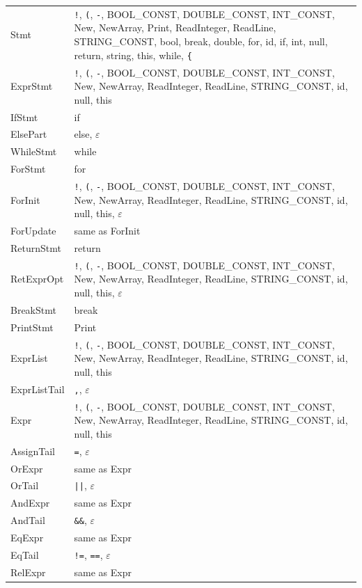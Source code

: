 \documentclass[12pt,a4paper]{article}
\begin{document}
\begin{longtable}{lp{10cm}}
Stmt           & \texttt{!}, \texttt{(}, \texttt{-}, BOOL\_CONST, DOUBLE\_CONST, INT\_CONST, New, NewArray, Print, ReadInteger, ReadLine, STRING\_CONST, bool, break, double, for, id, if, int, null, return, string, this, while, \texttt{\{} \\
ExprStmt       & \texttt{!}, \texttt{(}, \texttt{-}, BOOL\_CONST, DOUBLE\_CONST, INT\_CONST, New, NewArray, ReadInteger, ReadLine, STRING\_CONST, id, null, this \\
IfStmt         & if \\
ElsePart       & else, $\varepsilon$ \\
WhileStmt      & while \\
ForStmt        & for \\
ForInit        & \texttt{!}, \texttt{(}, \texttt{-}, BOOL\_CONST, DOUBLE\_CONST, INT\_CONST, New, NewArray, ReadInteger, ReadLine, STRING\_CONST, id, null, this, $\varepsilon$ \\
ForUpdate      & same as ForInit \\
ReturnStmt     & return \\
RetExprOpt     & \texttt{!}, \texttt{(}, \texttt{-}, BOOL\_CONST, DOUBLE\_CONST, INT\_CONST, New, NewArray, ReadInteger, ReadLine, STRING\_CONST, id, null, this, $\varepsilon$ \\
BreakStmt      & break \\
PrintStmt      & Print \\
ExprList       & \texttt{!}, \texttt{(}, \texttt{-}, BOOL\_CONST, DOUBLE\_CONST, INT\_CONST, New, NewArray, ReadInteger, ReadLine, STRING\_CONST, id, null, this \\
ExprListTail   & \texttt{,}, $\varepsilon$ \\
Expr           & \texttt{!}, \texttt{(}, \texttt{-}, BOOL\_CONST, DOUBLE\_CONST, INT\_CONST, New, NewArray, ReadInteger, ReadLine, STRING\_CONST, id, null, this \\
AssignTail     & \texttt{=}, $\varepsilon$ \\
OrExpr         & same as Expr \\
OrTail         & \texttt{||}, $\varepsilon$ \\
AndExpr        & same as Expr \\
AndTail        & \texttt{\&\&}, $\varepsilon$ \\
EqExpr         & same as Expr \\
EqTail         & \texttt{!=}, \texttt{==}, $\varepsilon$ \\
RelExpr        & same as Expr \\

\end{longtable}
\end{document}
